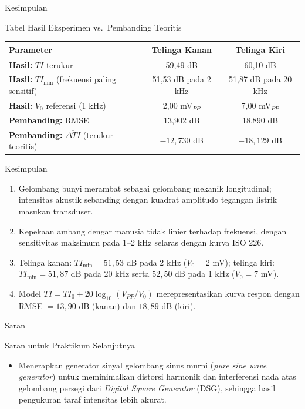 \documentclass[aspectratio=169, 10pt]{beamer}
\begin{document}
	\begin{frame}{Kesimpulan}
		\begin{exampleblock}{Tabel Hasil Eksperimen vs.\ Pembanding Teoritis}
			\centering
			\tiny
			\begin{tabular}{lcc}
				\toprule
				\textbf{Parameter} & \textbf{Telinga Kanan} & \textbf{Telinga Kiri} \\
				\midrule
				\textbf{Hasil:} $\overline{TI}$ terukur & 59{,}49 dB & 60{,}10 dB \\
				\textbf{Hasil:} $TI_{\min}$ (frekuensi paling sensitif) & 51{,}53 dB pada 2 kHz & 51{,}87 dB pada 20 kHz \\
				\textbf{Hasil:} $V_0$ referensi (1 kHz) & 2{,}00 mV$_{PP}$ & 7{,}00 mV$_{PP}$ \\
				\midrule
				\textbf{Pembanding:} RMSE & 13{,}902 dB & 18{,}890 dB \\
				\textbf{Pembanding:} $\overline{\Delta TI}$ (terukur $-$ teoritis) & $-12{,}730$ dB & $-18{,}129$ dB \\
				\bottomrule
			\end{tabular}
		\end{exampleblock}

		\begin{block}{Kesimpulan}
			\footnotesize
			\begin{enumerate}
				\item Gelombang bunyi merambat sebagai gelombang mekanik longitudinal; intensitas akustik sebanding dengan kuadrat amplitudo tegangan listrik masukan transduser.
				\item Kepekaan ambang dengar manusia tidak linier terhadap frekuensi, dengan sensitivitas maksimum pada 1--2 kHz selaras dengan kurva ISO 226.
				\item Telinga kanan: $TI_{\min} = 51{,}53$ dB pada 2 kHz ($V_0=2$ mV); telinga kiri: $TI_{\min} = 51{,}87$ dB pada 20 kHz serta $52{,}50$ dB pada 1 kHz ($V_0=7$ mV).
				\item Model $TI = TI_0 + 20\log_{10}(V_{PP}/V_0)$ merepresentasikan kurva respon dengan RMSE $= 13{,}90$ dB (kanan) dan $18{,}89$ dB (kiri).
			\end{enumerate}
		\end{block}
	\end{frame}

	\begin{frame}{Saran}
		\begin{block}{Saran untuk Praktikum Selanjutnya}
			\begin{itemize}
				\item Menerapkan generator sinyal gelombang sinus murni (\textit{pure sine wave generator}) untuk meminimalkan distorsi harmonik dan interferensi nada atas gelombang persegi dari \textit{Digital Square Generator} (DSG), sehingga hasil pengukuran taraf intensitas lebih akurat.
			\end{itemize}
		\end{block}
	\end{frame}
\end{document}
